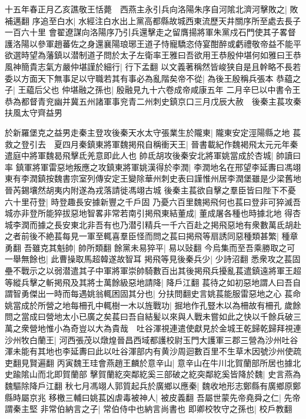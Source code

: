 十五年春正月乙亥譙敬王恬薨　西燕主永引兵向洛陽朱序自河隂北濟河擊敗之|{
	敗補邁翻}
序追至白水|{
	水經注白水出上黨高都縣故城西東流歷天井關序所至處去長子一百六十里}
會翟遼謀向洛陽序乃引兵還擊走之留膺揚將軍朱黨戍石門使其子畧督護洛陽以參軍趙蕃佐之身還襄陽琅琊王道子恃寵驕恣侍宴酣醉或虧禮敬帝益不能平欲選時望為藩鎮以潜制道子問於太子左衛率王雅曰吾欲用王恭殷仲堪何如雅曰王恭風神簡貴志氣方嚴仲堪謹於細行|{
	行下孟翻}
以文義著稱然皆峻狭自是且幹略不長若委以方面天下無事足以守職若其有事必為亂階矣帝不從|{
	為後王殷稱兵張本}
恭藴之子|{
	王藴后父也}
仲堪融之孫也|{
	殷融見九十六卷成帝咸康五年}
二月辛巳以中書令王恭為都督青兖幽并冀五州諸軍事兖青二州刺史鎮京口三月戊辰大赦　後秦主萇攻秦扶風太守齊益男

於新羅堡克之益男走秦主登攻後秦天水太守張業生於隴東|{
	隴東安定涇陽縣之地}
萇救之登引去　夏四月秦鎮東將軍魏掲飛自稱衝天王|{
	晉書載紀作魏褐飛太元元年秦遣庭中將軍魏曷飛擊氐羌意即此人也}
帥氐胡攻後秦安北將軍姚當成於杏城|{
	帥讀曰率}
鎮軍將軍雷惡地叛應之攻鎮東將軍姚漢得於李潤|{
	李潤地名在邢望李延夀曰馮翊東有李潤鎮按魏書宗室列傳安定王變除華州刺史表曰謹惟州居李潤堡雖是少梁舊地晉芮錫壤然胡夷内附遂為戎落請徙馮翊古城}
後秦主萇欲自擊之羣臣皆曰陛下不憂六十里苻登|{
	時登趣長安據新豐之千戶固}
乃憂六百里魏掲飛何也萇曰登非可猝滅吾城亦非登所能猝拔惡地智畧非常若南引掲飛東結董成|{
	董成屠各種也時據北地}
得杏城李潤而據之長安東北非吾有也乃潜引精兵一千六百赴之掲飛惡地有衆數萬氐胡赴之者前後不絶萇每見一軍至輒喜羣臣怪而問之萇曰掲飛等扇誘同惡種類甚繁|{
	種章勇翻}
吾雖克其魁帥|{
	帥所類翻}
餘黨未易猝平|{
	易以䜴翻}
今烏集而至吾乘勝取之可一舉無餘也|{
	此曹操取馬超韓遂故智耳}
掲飛等見後秦兵少|{
	少詩沼翻}
悉衆攻之萇固壘不戰示之以弱潜遣其子中軍將軍崇帥騎數百出其後掲飛兵擾亂萇遣鎮遠將軍王超等縱兵擊之斬掲飛及其將士萬餘級惡地請降|{
	降戶江翻}
萇待之如初惡地謂人曰吾自謂智勇傑出一時而每遇姚翁輒困固其分也|{
	分扶問翻史言姚萇能服雷惡地之心}
萇命姚當成於所營之地每柵孔中輒樹一木以旌戰功|{
	掘地作孔豎木以為柵故有柵孔}
歲餘問之當成曰營地太小已廣之矣萇曰吾自結髪以來與人戰未嘗如此之快以千餘兵破三萬之衆營地惟小為奇豈以大為貴哉　吐谷渾視連遣使獻見於金城王乾歸乾歸拜視連沙州牧白蘭王|{
	河西張茂以燉煌晉昌西域都護校尉玉門大護軍三郡三營為沙州吐谷渾未能有其地也李延夀曰此以吐谷渾部内有黄沙周迴數百里不生草木因號沙州使疏吏翻見賢遍翻}
丙寅魏王珪會燕趙王麟於意辛山|{
	意辛山在牛川北賀蘭部所居也據北史踰隂山而北即賀蘭部}
擊賀蘭紇突鄰紇奚三部破之紇突鄰紇奚皆降於魏|{
	史言燕為魏驅除降戶江翻}
秋七月馮翊人郭質起兵於廣鄉以應秦|{
	魏收地形志鄭縣有廣鄉原鄭縣時屬京兆}
移檄三輔曰姚萇凶虐毒被神人|{
	被皮義翻}
吾屬世蒙先帝堯舜之仁|{
	先帝謂秦主堅}
非常伯納言之子|{
	常伯侍中也納言尚書也}
即卿校牧守之孫也|{
	校戶教翻}
